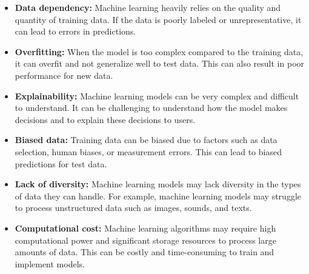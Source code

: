 \begin{itemize}
    \item{\textbf{Data dependency:} Machine learning heavily relies on the quality and quantity of training data. If the data is poorly labeled or unrepresentative, it can lead to errors in predictions.}
    \item{\textbf{Overfitting:} When the model is too complex compared to the training data, it can overfit and not generalize well to test data. This can also result in poor performance for new data.}
    \item{\textbf{Explainability:} Machine learning models can be very complex and difficult to understand. It can be challenging to understand how the model makes decisions and to explain these decisions to users.}
    \item{\textbf{Biased data:} Training data can be biased due to factors such as data selection, human biases, or measurement errors. This can lead to biased predictions for test data.}
    \item{\textbf{Lack of diversity:} Machine learning models may lack diversity in the types of data they can handle. For example, machine learning models may struggle to process unstructured data such as images, sounds, and texts.}
    \item{\textbf{Computational cost:} Machine learning algorithms may require high computational power and significant storage resources to process large amounts of data. This can be costly and time-consuming to train and implement models.}
\end{itemize}